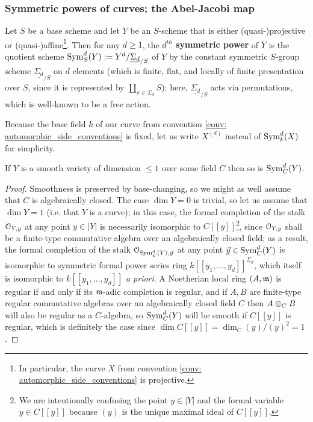         \subsubsection{Symmetric powers of curves; the Abel-Jacobi map}
            \begin{definition} \label{def: symmetric_powers_of_schemes}
                Let $S$ be a base scheme and let $Y$ be an $S$-scheme that is either (quasi-)projective or (quasi-)affine\footnote{In particular, the curve $X$ from convention \ref{conv: automorphic_side_conventions} is projective.}. Then for any $d \geq 1$, the \textbf{$d^{th}$ symmetric power} of $Y$ is the quotient scheme $\mathrm{Sym}^d_S(Y) := Y^d/\underline{\Sigma_d}_{/S}$ of $Y$ by the constant symmetric $S$-group scheme $\underline{\Sigma_d}_{/S}$ on $d$ elements (which is finite, flat, and locally of finite presentation over $S$, since it is represented by $\coprod_{\sigma \in \Sigma_d} S$); here, $\underline{\Sigma_d}_{/S}$ acts via permutations, which is well-known to be a free action.
            \end{definition}
            \begin{convention}
                Because the base field $k$ of our curve from convention \ref{conv: automorphic_side_conventions} is fixed, let us write $X^{(d)}$ instead of $\mathrm{Sym}^d_k(X)$ for simplicity.
            \end{convention}
            \begin{lemma} \label{lemma: smoothness_of_symmetric_powers}
                If $Y$ is a smooth variety of dimension $\leq 1$ over some field $C$ then so is $\mathrm{Sym}_C^d(Y)$.
            \end{lemma}
                \begin{proof}
                    Smoothness is preserved by base-changing, so we might as well assume that $C$ is algebraically closed. The case $\dim Y = 0$ is trivial, so let us assume that $\dim Y = 1$ (i.e. that $Y$ is a curve); in this case, the formal completion of the stalk $\mathcal{O}_{Y, y}$ at any point $y \in |Y|$ is necessarily isomorphic to $C[\![y]\!]$\footnote{We are intentionally confusing the point $y \in |Y|$ and the formal variable $y \in C[\![y]\!]$ because $(y)$ is the unique maximal ideal of $C[\![y]\!]$.}, since $\mathcal{O}_{Y, y}$ shall be a finite-type commutative algebra over an algebraically closed field; as a result, the formal completion of the stalk $\mathcal{O}_{\mathrm{Sym}^d_C(Y), \vec{y}}$ at any point $\vec{y} \in \mathrm{Sym}^d_C(Y)$ is isomorphic to symmetric formal power series ring $k[\![y_1, ..., y_d]\!]^{\Sigma_d}$, which itself is isomorphic to $k[\![y_1, ..., y_d]\!]$ \textit{a priori}. A Noetherian local ring $(A, \mathfrak{m})$ is regular if and only if its $\mathfrak{m}$-adic completion is regular, and if $A, B$ are finite-type regular commutative algebras over an algebraically closed field $C$ then $A \tensor_C B$ will also be regular as a $C$-algebra, so $\mathrm{Sym}_C^d(Y)$ will be smooth if $C[\![y]\!]$ is regular, which is definitely the case since $\dim C[\![y]\!] = \dim_C (y)/(y)^2 = 1$.
                \end{proof}
